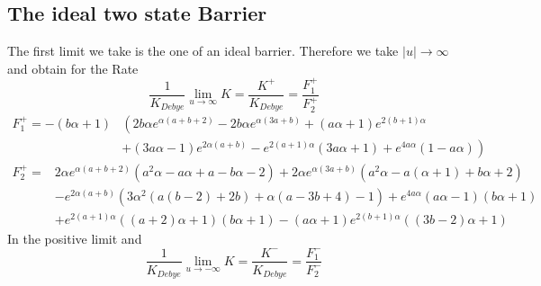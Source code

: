\subsection{The ideal two state Barrier}

The first limit we take is the one of an ideal barrier. Therefore we take $|u| \rightarrow \infty$ and obtain for the Rate
\begin{equation}
    \frac{1}{K_{Debye}}\lim_{u \rightarrow \infty}K = \frac{K^{+}}{K_{Debye}} = \frac{F_{1}^{+}}{F_{2}^{+}}
    \label{K+}
\end{equation}
\begin{align*}
    F_{1}^{+} = -(b \alpha+1)  & \left( 2 b \alpha e^{\alpha (a+b+2)}-2 b \alpha e^{\alpha (3 a+b)}+(a \alpha+1) e^{2 (b+1) \alpha} \right. \\
                                & \left.+(3 a \alpha-1) e^{2 \alpha (a+b)} -e^{2 (a+1) \alpha} (3 a \alpha+1)+e^{4 a \alpha} (1-a \alpha) \right)
\end{align*}
\begin{align*}
    F_{2}^{+} = & 2 \alpha e^{\alpha (a+b+2)} \left(a^2 \alpha-a \alpha+a-b \alpha-2\right)+2 \alpha e^{\alpha (3 a+b)} \left(a^2 \alpha-a (\alpha+1)+b \alpha+2\right) \\
                &-e^{2 \alpha (a+b)} \left(3 \alpha^2 (a (b-2)+2 b)+\alpha (a-3 b+4)-1\right)+e^{4 a \alpha} (a \alpha-1) (b \alpha+1) \\
                &+e^{2 (a+1) \alpha} ((a+2) \alpha+1) (b \alpha+1)-(a \alpha+1) e^{2 (b+1) \alpha} ((3 b-2) \alpha+1)
\end{align*}
In the positive limit and 
\begin{equation}
    \frac{1}{K_{Debye}} \lim_{u \rightarrow -\infty}K = \frac{K^{-}}{K_{Debye}} =  \frac{F_{1}^{-}}{F_{2}^{-}}
        \label{K-}
\end{equation}

